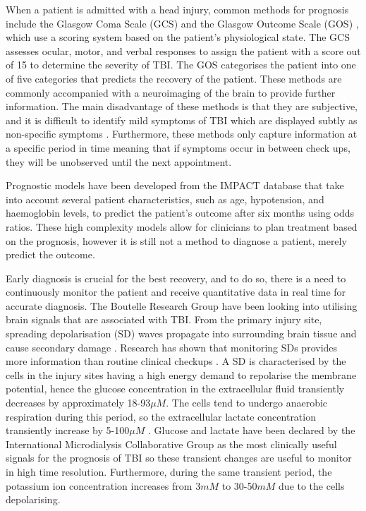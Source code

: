 When a patient is admitted with a head injury, common methods for prognosis include the Glasgow Coma Scale (GCS) \cite{WorldHealthOrganisation2006} and the Glasgow Outcome Scale (GOS) \cite{Jennett1975}, which use a scoring system based on the patient's physiological state. The GCS assesses ocular, motor, and verbal responses to assign the patient with a score out of 15 to determine the severity of TBI. The GOS categorises the patient into one of five categories that predicts the recovery of the patient. These methods are commonly accompanied with a neuroimaging of the brain to provide further information. The main disadvantage of these methods is that they are subjective, and it is difficult to identify mild symptoms of TBI which are displayed subtly as non-specific symptoms \cite{Bettermann2012}. Furthermore, these methods only capture information at a specific period in time meaning that if symptoms occur in between check ups, they will be unobserved until the next appointment. 

Prognostic models \cite{Steyerberg2008} have been developed from the IMPACT database \cite{Maas2007} that take into account several patient characteristics, such as age, hypotension, and haemoglobin levels, to predict the patient's outcome after six months using odds ratios. These high complexity models allow for clinicians to plan treatment based on the prognosis, however it is still not a method to diagnose a patient, merely predict the outcome. 

Early diagnosis is crucial for the best recovery, and to do so, there is a need to continuously monitor the patient and receive quantitative data in real time for accurate diagnosis. The Boutelle Research Group have been looking into utilising brain signals that are associated with TBI. From the primary injury site, spreading depolarisation (SD) waves \cite{Leao1944} propagate into surrounding brain tissue and cause secondary damage \cite{Brain2011}. Research has shown that monitoring SDs provides more information than routine clinical checkups \cite{Hartings2011}. A SD is characterised by the cells in the injury sites having a high energy demand to repolarise the membrane potential, hence the glucose concentration in the extracellular fluid transiently decreases by approximately 18-93$\mu M$. The cells tend to undergo anaerobic respiration during this period, so the extracellular lactate concentration transiently increase by 5-100$\mu M$ \cite{D.2010}. Glucose and lactate have been declared by the International Microdialysis Collaborative Group as the most clinically useful signals for the prognosis of TBI \cite{Hutchinson2015} so these transient changes are useful to monitor in high time resolution. Furthermore, during the same transient period, the potassium ion concentration increases \cite{Rogers2011} from 3$mM$ \cite{Katzman1976} to 30-50$mM$ \cite{Ayata2015} due to the cells depolarising. 


